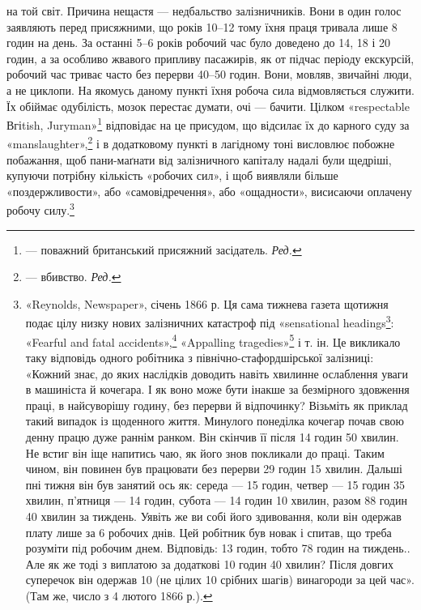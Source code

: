 \parcont{}  %
на той світ. Причина нещастя — недбальство залізничників. Вони
в один голос заявляють перед присяжними, що років 10--12 тому
їхня праця тривала лише 8 годин на день. За останні 5--6 років
робочий час було доведено до 14, 18 і 20 годин, а за особливо
жвавого припливу пасажирів, як от підчас періоду екскурсій,
робочий час триває часто без перерви 40--50 годин. Вони, мовляв,
звичайні люди, а не циклопи. На якомусь даному пункті
їхня робоча сила відмовляється служити. Їх обіймає одубілість,
мозок перестає думати, очі — бачити. Цілком «respectable Вгіtish,
Juryman»\footnote*{
— поважний британський присяжний засідатель. \emph{Ред.}
} відповідає на це присудом, що відсилає їх до
карного суду за «manslaughter»,\footnote*{
— вбивство. \emph{Ред.}
} і в додатковому пункті в лагідному
тоні висловлює побожне побажання, щоб пани-маґнати
від залізничного капіталу надалі були щедріші, купуючи потрібну
кількість «робочих сил», і щоб виявляли більше «поздержливости»,
або «самовідречення», або «ощадности», висисаючи
оплачену робочу силу.\footnote{
«Reynolds, Newspaper», січень 1866 р. Ця сама тижнева газета щотижня
подає цілу низку нових залізничних катастроф під «sensational headings\footnote*{
— сенсаційними заголовками. \emph{Ред.}
}:
«Fearful and fatal accidents»,\footnote*{
Жахливий і фатальний випадок. \emph{Ред.}
} «Appalling tragedies»\footnote*{
Жахлива трагедія. \emph{Ред.}
} і т. ін.
Це викликало таку відповідь одного робітника з північно-стафордшірської
залізниці: «Кожний знає, до яких наслідків доводить навіть хвилинне
ослаблення уваги в машиніста й кочегара. І як воно може бути інакше
за безмірного здовження праці, в найсуворішу годину, без перерви й відпочинку?
Візьміть як приклад такий випадок із щоденного життя. Минулого
понеділка кочегар почав свою денну працю дуже раннім ранком.
Він скінчив її після 14 годин 50 хвилин. Не встиг він іще напитись чаю,
як його знов покликали до праці. Таким чином, він повинен був працювати
без перерви 29 годин 15 хвилин. Дальші пні тижня він був занятий ось
як: середа — 15 годин, четвер — 15 годин 35 хвилин, п’ятниця — 14 годин,
субота — 14 годин 10 хвилин, разом 88 годин 40 хвилин за тиждень.
Уявіть же ви собі його здивовання, коли він одержав плату лише за 6 робочих
днів. Цей робітник був новак і спитав, що треба розуміти під робочим
днем. Відповідь: 13 годин, тобто 78 годин на тиждень.. Але як же тоді
з виплатою за додаткові 10 годин 40 хвилин? Після довгих суперечок він
одержав 10 (не цілих 10 срібних шагів) винагороди за цей час».
(Там же, число з 4 лютого 1866 р.).
}

